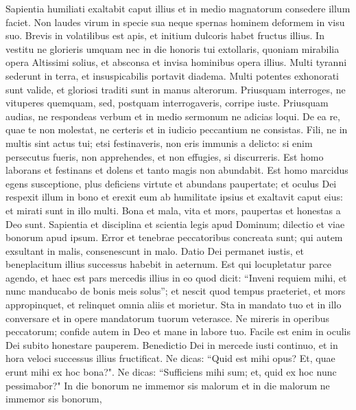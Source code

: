 \begin{biblechapter}  
\verse Sapientia humiliati exaltabit caput illius et in medio magnatorum consedere illum faciet. 
\verse Non laudes virum in specie sua neque spernas hominem deformem in visu suo. 
\verse Brevis in volatilibus est apis, et initium dulcoris habet fructus illius. 
\verse In vestitu ne glorieris umquam nec in die honoris tui extollaris, quoniam mirabilia opera Altissimi solius, et absconsa et invisa hominibus opera illius. 
\verse Multi tyranni sederunt in terra, et insuspicabilis portavit diadema. 
\verse Multi potentes exhonorati sunt valide, et gloriosi traditi sunt in manus alterorum. 
\verse Priusquam interroges, ne vituperes quemquam, sed, postquam interrogaveris, corripe iuste. 
\verse Priusquam audias, ne respondeas verbum et in medio sermonum ne adicias loqui. 
\verse De ea re, quae te non molestat, ne certeris et in iudicio peccantium ne consistas. 
\verse Fili, ne in multis sint actus tui; etsi festinaveris, non eris immunis a delicto: si enim persecutus fueris, non apprehendes, et non effugies, si discurreris. 
\verse Est homo laborans et festinans et dolens et tanto magis non abundabit. 
\verse Est homo marcidus egens susceptione, plus deficiens virtute et abundans paupertate; 
\verse et oculus Dei respexit illum in bono et erexit eum ab humilitate ipsius et exaltavit caput eius: et mirati sunt in illo multi. 
\verse Bona et mala, vita et mors, paupertas et honestas a Deo sunt. 
\verse Sapientia et disciplina et scientia legis apud Dominum; dilectio et viae bonorum apud ipsum. 
\verse Error et tenebrae peccatoribus concreata sunt; qui autem exsultant in malis, consenescunt in malo. 
\verse Datio Dei permanet iustis, et beneplacitum illius successus habebit in aeternum. 
\verse Est qui locupletatur parce agendo, et haec est pars mercedis illius 
\verse in eo quod dicit: “Inveni requiem mihi, et nunc manducabo de bonis meis solus”; 
\verse et nescit quod tempus praeteriet, et mors appropinquet, et relinquet omnia aliis et morietur. 
\verse Sta in mandato tuo et in illo conversare et in opere mandatorum tuorum veterasce. 
\verse Ne mireris in operibus peccatorum; confide autem in Deo et mane in labore tuo. 
\verse Facile est enim in oculis Dei subito honestare pauperem. 
\verse Benedictio Dei in mercede iusti continuo, et in hora veloci successus illius fructificat. 
\verse Ne dicas: “Quid est mihi opus? Et, quae erunt mihi ex hoc bona?". 
\verse Ne dicas: “Sufficiens mihi sum; et, quid ex hoc nunc pessimabor?" 
\verse In die bonorum ne immemor sis malorum et in die malorum ne immemor sis bonorum, 

\end{biblechapter}
